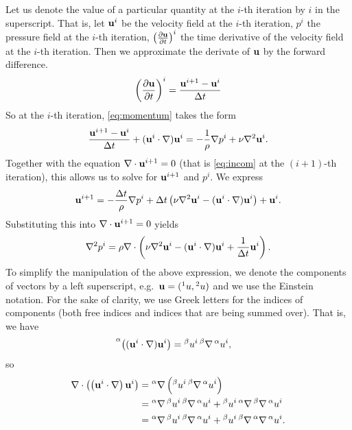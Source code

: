 \documentclass{article}
\begin{document}
Let us denote the value of a particular quantity at the $i$-th iteration by $i$ in the superscript. That is, let $\mathbf u^i$ be the velocity field at the $i$-th iteration, $p^i$ the pressure field at the $i$-th iteration, $\left(\frac{\partial \mathbf u}{\partial t}\right)^i$ the time derivative of the velocity field at the $i$-th iteration. Then we approximate the derivate of $\mathbf u$ by the forward difference.
\begin{align}
	\left(\frac{\partial \mathbf u}{\partial t}\right)^i=\frac{\mathbf u^{i+1}-\mathbf u^i}{\Delta t}
\end{align}
So at the $i$-th iteration, \eqref{eq:momentum} takes the form
\begin{align}
	\frac{\mathbf u^{i+1}-\mathbf u^i}{\Delta t}+(\mathbf u^i\cdot\nabla)\mathbf u^i=-\frac1\rho\nabla p^i+\nu\nabla^2\mathbf u^i.
\end{align}
Together with the equation $\nabla\cdot\mathbf u^{i+1}=0$ (that is \eqref{eq:incom} at the $(i+1)$-th iteration), this allows us to solve for $\mathbf u^{i+1}$ and $p^i$. We express
\begin{align}
	\mathbf u^{i+1}=-\frac{\Delta t}\rho\nabla p^i+\Delta t\left(\nu\nabla^2\mathbf u^i-(\mathbf u^i\cdot\nabla)\mathbf u^i\right)+\mathbf u^i.
\end{align}
Substituting this into $\nabla\cdot\mathbf u^{i+1}=0$ yields
\newcommand{\prsc}[2]{\prescript{#1}{#2}}
\newcommand{\prusc}[1]{\prescript{#1}{}}
\begin{align}
	\nabla^2p^i=\rho\nabla\cdot\left(\nu\nabla^2\mathbf u^i-(\mathbf u^i\cdot\nabla)\mathbf u^i+\frac1{\Delta t}\mathbf u^i\right).
\end{align}
To simplify the manipulation of the above expression, we denote the components of vectors by a left superscript, e.g.\ $\uu=(\prusc1u,\prusc2u)$ and we use the Einstein notation. For the sake of clarity, we use Greek letters for the indices of components (both free indices and indices that are being summed over). That is, we have
\begin{align}
	\prusc\alpha{\left({(\uu^i\cdot\nabla)\uu^i}\right)}&=\prusc\beta u^i\prusc\beta\nabla\prusc\alpha u^i,
\end{align}
so
\begin{align}
	\nabla\cdot\left(\left(\uu^i\cdot\nabla\right)\uu^i\right)&=\prusc\alpha\nabla\left(\prusc\beta u^i\prusc\beta\nabla\prusc\alpha u^i\right)\\
	&=\prusc\alpha\nabla\prusc\beta u^i\prusc\beta\nabla\prusc\alpha u^i+\prusc\beta u^i\prusc\alpha\nabla\prusc\beta\nabla\prusc\alpha u^i\\
	&=\prusc\alpha\nabla\prusc\beta u^i\prusc\beta\nabla\prusc\alpha u^i+\prusc\beta u^i\prusc\beta\nabla\prusc\alpha\nabla\prusc\alpha u^i.
\end{align}
\end{document}
